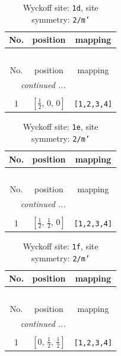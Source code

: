 \documentclass[fleqn,8pt]{jsarticle}
\begin{document}
\renewcommand{\arraystretch}{1.2}
\begin{longtable}{ccc}
\caption{Wyckoff site: {\tt 1d}, site symmetry: {\tt 2/m'}}
 \\
 \hline \hline
No. & position & mapping \\ \hline \endfirsthead

\multicolumn{2}{l}{\tablename\ \thetable{}} \\
 \hline \hline
No. & position & mapping \\ \hline \endhead

 \hline \hline
\multicolumn{2}{r}{\footnotesize\it continued ...} \\ \endfoot

 \hline \hline
\multicolumn{2}{r}{} \\ \endlastfoot

1 & $\left[ \frac{1}{2},\, 0,\, 0 \right]$ & {\tt [1,2,3,4]} \\
\end{longtable}
\renewcommand{\arraystretch}{1.2}
\begin{longtable}{ccc}
\caption{Wyckoff site: {\tt 1e}, site symmetry: {\tt 2/m'}}
 \\
 \hline \hline
No. & position & mapping \\ \hline \endfirsthead

\multicolumn{2}{l}{\tablename\ \thetable{}} \\
 \hline \hline
No. & position & mapping \\ \hline \endhead

 \hline \hline
\multicolumn{2}{r}{\footnotesize\it continued ...} \\ \endfoot

 \hline \hline
\multicolumn{2}{r}{} \\ \endlastfoot

1 & $\left[ \frac{1}{2},\, \frac{1}{2},\, 0 \right]$ & {\tt [1,2,3,4]} \\
\end{longtable}
\renewcommand{\arraystretch}{1.2}
\begin{longtable}{ccc}
\caption{Wyckoff site: {\tt 1f}, site symmetry: {\tt 2/m'}}
 \\
 \hline \hline
No. & position & mapping \\ \hline \endfirsthead

\multicolumn{2}{l}{\tablename\ \thetable{}} \\
 \hline \hline
No. & position & mapping \\ \hline \endhead

 \hline \hline
\multicolumn{2}{r}{\footnotesize\it continued ...} \\ \endfoot

 \hline \hline
\multicolumn{2}{r}{} \\ \endlastfoot

1 & $\left[ 0,\, \frac{1}{2},\, \frac{1}{2} \right]$ & {\tt [1,2,3,4]} \\
\end{longtable}
\end{document}
